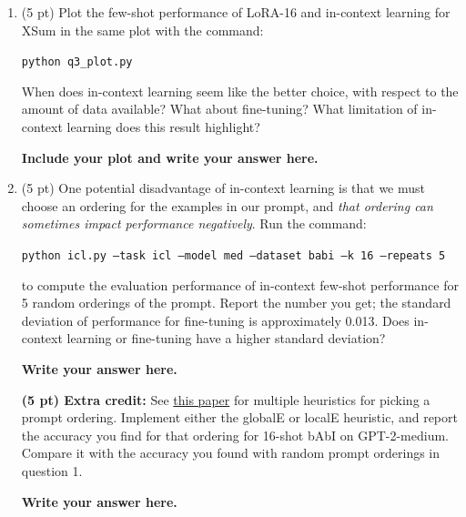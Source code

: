 \documentclass[12pt]{article}
\begin{document}
\begin{enumerate}
    \item (5 pt) Plot the few-shot performance of LoRA-16 and in-context learning for XSum in the same plot with the command:

    {\small\texttt{python q3\_plot.py}}

    When does in-context learning seem like the better choice, with respect to the amount of data available? What about fine-tuning? What limitation of in-context learning does this result highlight?
    
    \textbf{\color{red}Include your plot and write your answer here.}

    \item (5 pt) One potential disadvantage of in-context learning is that we must choose an ordering for the examples in our prompt, and \textit{that ordering can sometimes impact performance negatively}. Run the command:

    {\small \texttt{python icl.py --task icl --model med --dataset babi --k 16 --repeats 5}}

    to compute the evaluation performance of in-context few-shot performance for 5 random orderings of the prompt. Report the number you get; the standard deviation of performance for fine-tuning is approximately 0.013. Does in-context learning or fine-tuning have a higher standard deviation?
    
    \textbf{\color{red}Write your answer here.}

    \textbf{(5 pt) Extra credit:} See \href{https://arxiv.org/pdf/2104.08786.pdf}{this paper} for multiple heuristics for picking a prompt ordering. Implement either the globalE or localE heuristic, and report the accuracy you find for that ordering for 16-shot bAbI on GPT-2-medium. Compare it with the accuracy you found with random prompt orderings in question 1.
    
    \textbf{\color{red}Write your answer here.}
\end{enumerate}
\end{document}
